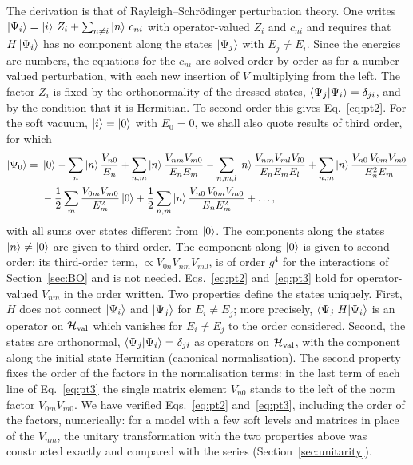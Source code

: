 The derivation is that of Rayleigh--Schr\"odinger perturbation theory. One writes $\ket{\Psi_i}=\ket i\,Z_i+\sum_{n\ne i}\ket n\,c_{ni}$ with operator-valued $Z_i$ and $c_{ni}$ and requires that $H\ket{\Psi_i}$ has no component along the states $\ket{\Psi_j}$ with $E_j\neq E_i$. Since the energies are numbers, the equations for the $c_{ni}$ are solved order by order as for a number-valued perturbation, with each new insertion of $V$ multiplying from the left. The factor $Z_i$ is fixed by the orthonormality of the dressed states, $\braket{\Psi_j|\Psi_i}=\delta_{ji}$, and by the condition that it is Hermitian. To second order this gives Eq.~\eqref{eq:pt2}. For the soft vacuum, $\ket i=\ket0$ with $E_0=0$, we shall also quote results of third order, for which
\begin{align}\label{eq:pt3}
\ket{\Psi_0}=\ &\ket0-\sum_n\ket n\frac{V_{n0}}{E_n}+\sum_{n,m}\ket n\frac{V_{nm}V_{m0}}{E_nE_m}
-\sum_{n,m,l}\ket n\frac{V_{nm}V_{ml}V_{l0}}{E_nE_mE_l}
+\sum_{n,m}\ket n\frac{V_{n0}\,V_{0m}V_{m0}}{E_n^2E_m}
\notag\\
&-\frac12\sum_m\frac{V_{0m}V_{m0}}{E_m^2}\ket0
+\frac12\sum_{n,m}\ket n\frac{V_{n0}\,V_{0m}V_{m0}}{E_nE_m^2}+\dots,
\end{align}
with all sums over states different from $\ket0$. The components along the states $\ket n\neq\ket0$ are given to third order. The component along $\ket0$ is given to second order; its third-order term, $\propto V_{0n}V_{nm}V_{m0}$, is of order $g^4$ for the interactions of Section~\ref{sec:BO} and is not needed. Eqs.~\eqref{eq:pt2} and~\eqref{eq:pt3} hold for operator-valued $V_{nm}$ in the order written. Two properties define the states uniquely. First, $H$ does not connect $\ket{\Psi_i}$ and $\ket{\Psi_j}$ for $E_i\neq E_j$; more precisely, $\braket{\Psi_j|H|\Psi_i}$ is an operator on $\mathcal H_{\rm val}$ which vanishes for $E_i\ne E_j$ to the order considered. Second, the states are orthonormal, $\braket{\Psi_j|\Psi_i}=\delta_{ji}$ as operators on $\mathcal H_{\rm val}$, with the component along the initial state Hermitian (canonical normalisation). The second property fixes the order of the factors in the normalisation terms: in the last term of each line of Eq.~\eqref{eq:pt3} the single matrix element $V_{n0}$ stands to the left of the norm factor $V_{0m}V_{m0}$. We have verified Eqs.~\eqref{eq:pt2} and~\eqref{eq:pt3}, including the order of the factors, numerically: for a model with a few soft levels and matrices in place of the $V_{nm}$, the unitary transformation with the two properties above was constructed exactly and compared with the series (Section~\ref{sec:unitarity}).


